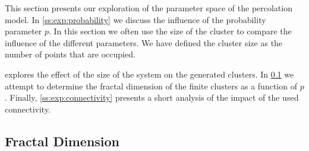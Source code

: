 This section presents our exploration of the parameter space of the percolation model. In \cref{ss:exp:probability} we discuss the influence of the probability parameter $p$. In this section we often use the size of the cluster to compare the influence of the different parameters. We have defined the cluster size as the number of points that are occupied. 

 explores the effect of the size of the system on the generated clusters. In \cref{ss:exp:fractal} we attempt to determine the fractal dimension of the finite clusters as a function of $p$. Finally, \cref{ss:exp:connectivity} presents a short analysis of the impact of the used connectivity.


% 

% 

\subsection{Fractal Dimension}
\label{ss:exp:fractal}
	

% 
